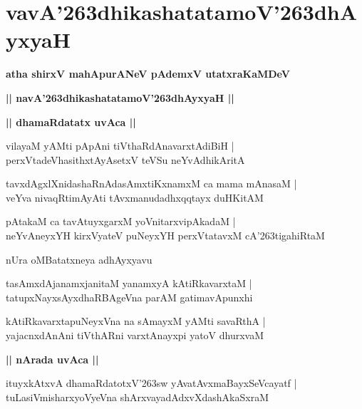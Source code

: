 \documentclass[twoside,12pt,openright]{book}
\def\S{\char'263}
\newcounter{shloka}[chapter]
\def\uvaca#1{\centerline{{\large\textbf{#1}}}}
\begin{document}
\chapter{vavA\S dhikashatatamoV\S dhAyxyaH}

\begin{center}
{\LARGE\bfseries atha shirxV mahApurANeV pAdemxV utatxraKaMDeV}
\end{center}

\begin{center}
{\LARGE\bfseries || navA\S dhikashatatamoV\S dhAyxyaH || }
\end{center}

\uvaca{|| dhamaRdatatx uvAca ||}

\begin{shloka}%
vilayaM yAMti pApAni tiVthaRdAnavarxtAdiBiH |\\
perxVtadeVhasithxtAyAsetxV teVSu neYvAdhikAritA 
\end{shloka}

\begin{shloka}%
tavxdAgxlXnidashaRnAdasAmxtiKxnamxM ca mama mAnasaM |\\
veYva nivaqRtimAyAti tAvxmanudadhxqqtayx duHKitAM 
\end{shloka}

\begin{shloka}%
pAtakaM ca tavAtuyxgarxM yoVnitarxvipAkadaM |\\
neYvAneyxYH kirxVyateV puNeyxYH perxVtatavxM cA\S tigahiRtaM 
\end{shloka}

\begin{center}
nUra oMBatatxneya adhAyxyavu
\end{center}

\begin{shloka}%
tasAmxdAjanamxjanitaM yanamxyA kAtiRkavarxtaM |\\
tatupxNayxsAyxdhaRBAgeVna parAM gatimavApunxhi
\end{shloka}

\begin{shloka}%
kAtiRkavarxtapuNeyxVna na sAmayxM yAMti savaRthA |\\
yajacnxdAnAni tiVthARni varxtAnayxpi yatoV dhurxvaM 
\end{shloka}

\uvaca{|| nArada uvAca ||}

\begin{shloka}%
ituyxkAtxvA dhamaRdatotxV\S sw yAvatAvxmaBayxSeVcayatf |\\
tuLasiVmisharxyoVyeVna shArxvayadAdxvXdashAkaSxraM 
\end{shloka}
\end{document}
